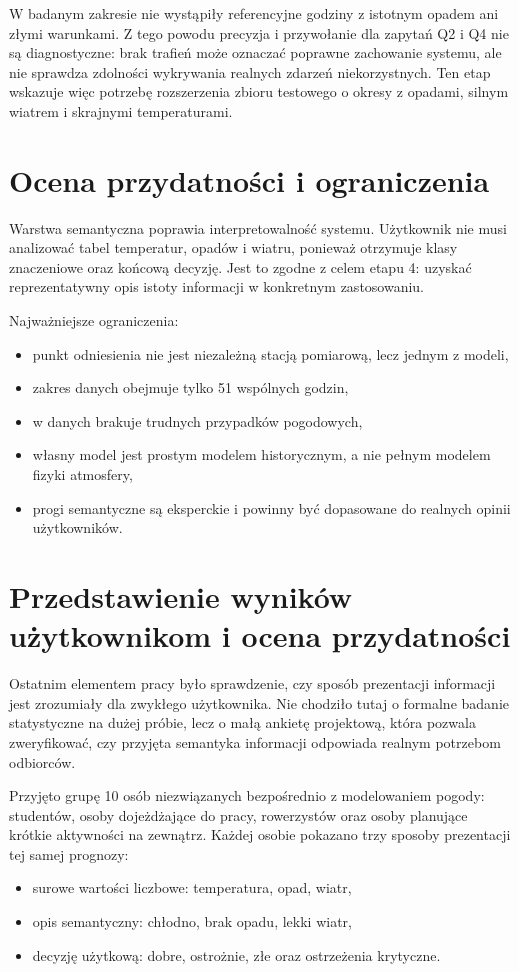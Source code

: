\documentclass[a4paper,12pt]{article}
\begin{document}
W badanym zakresie nie wystąpiły referencyjne godziny z istotnym opadem ani
złymi warunkami. Z tego powodu precyzja i przywołanie dla zapytań Q2 i Q4 nie
są diagnostyczne: brak trafień może oznaczać poprawne zachowanie systemu, ale
nie sprawdza zdolności wykrywania realnych zdarzeń niekorzystnych. Ten etap
wskazuje więc potrzebę rozszerzenia zbioru testowego o okresy z opadami,
silnym wiatrem i skrajnymi temperaturami.

\section{Ocena przydatności i ograniczenia}

Warstwa semantyczna poprawia interpretowalność systemu. Użytkownik nie musi
analizować tabel temperatur, opadów i wiatru, ponieważ otrzymuje klasy
znaczeniowe oraz końcową decyzję. Jest to zgodne z celem etapu 4: uzyskać
reprezentatywny opis istoty informacji w konkretnym zastosowaniu.

Najważniejsze ograniczenia:
\begin{itemize}
    \item punkt odniesienia nie jest niezależną stacją pomiarową, lecz jednym z modeli,
    \item zakres danych obejmuje tylko 51 wspólnych godzin,
    \item w danych brakuje trudnych przypadków pogodowych,
    \item własny model jest prostym modelem historycznym, a nie pełnym modelem fizyki atmosfery,
    \item progi semantyczne są eksperckie i powinny być dopasowane do realnych opinii użytkowników.
\end{itemize}


\section{Przedstawienie wyników użytkownikom i ocena przydatności}

Ostatnim elementem pracy było sprawdzenie, czy sposób prezentacji informacji
jest zrozumiały dla zwykłego użytkownika. Nie chodziło tutaj o formalne badanie
statystyczne na dużej próbie, lecz o małą ankietę projektową, która pozwala
zweryfikować, czy przyjęta semantyka informacji odpowiada realnym potrzebom
odbiorców.

Przyjęto grupę 10 osób niezwiązanych bezpośrednio z modelowaniem pogody:
studentów, osoby dojeżdżające do pracy, rowerzystów oraz osoby planujące
krótkie aktywności na zewnątrz. Każdej osobie pokazano trzy sposoby prezentacji
tej samej prognozy:
\begin{itemize}
    \item surowe wartości liczbowe: temperatura, opad, wiatr,
    \item opis semantyczny: chłodno, brak opadu, lekki wiatr,
    \item decyzję użytkową: dobre, ostrożnie, złe oraz ostrzeżenia krytyczne.
\end{itemize}
\end{document}
